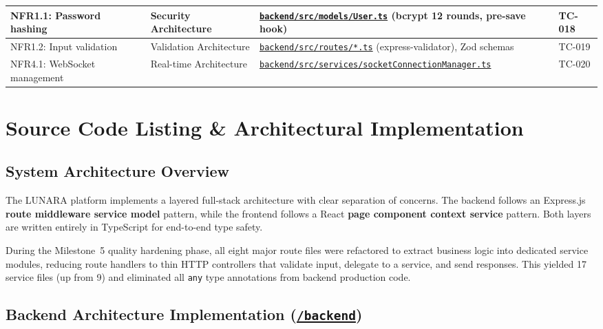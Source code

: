 \documentclass[12pt,letterpaper]{article}
\newcommand{\ghrepo}{https://github.com/omniV1/lunaraCare}
\begin{document}
{\begin{longtable}{|>{\raggedright\arraybackslash}p{2.2cm}|>{\raggedright\arraybackslash}p{2.5cm}|>{\raggedright\arraybackslash}p{5.5cm}|>{\raggedright\arraybackslash}p{2.5cm}|}
\hline
\rowcolor{TableRowAlt}
NFR1.1: Password hashing & Security Architecture & \href{\ghrepo/blob/main/backend/src/models/User.ts}{\texttt{backend/src/models/User.ts}} (bcrypt 12 rounds, pre-save hook) & TC-018 \\
\hline
NFR1.2: Input validation & Validation Architecture & \href{\ghrepo/tree/main/backend/src/routes}{\texttt{backend/src/routes/*.ts}} (express-validator), Zod schemas & TC-019 \\
\hline
\rowcolor{TableRowAlt}
NFR4.1: WebSocket management & Real-time Architecture & \href{\ghrepo/blob/main/backend/src/services/socketConnectionManager.ts}{\texttt{backend/src/services/socketConnectionManager.ts}} & TC-020 \\
\hline
\end{longtable}
}

\newpage

\section{Source Code Listing \& Architectural Implementation}

\subsection{System Architecture Overview}

The LUNARA platform implements a layered full-stack architecture with clear separation of concerns. The backend follows an Express.js \textbf{route \textrightarrow{} middleware \textrightarrow{} service \textrightarrow{} model} pattern, while the frontend follows a React \textbf{page \textrightarrow{} component \textrightarrow{} context \textrightarrow{} service} pattern. Both layers are written entirely in TypeScript for end-to-end type safety.

During the Milestone~5 quality hardening phase, all eight major route files were refactored to extract business logic into dedicated service modules, reducing route handlers to thin HTTP controllers that validate input, delegate to a service, and send responses. This yielded 17 service files (up from 9) and eliminated all \texttt{any} type annotations from backend production code.

\subsection{Backend Architecture Implementation (\href{\ghrepo/tree/main/backend}{\texttt{/backend}})}
\end{document}
